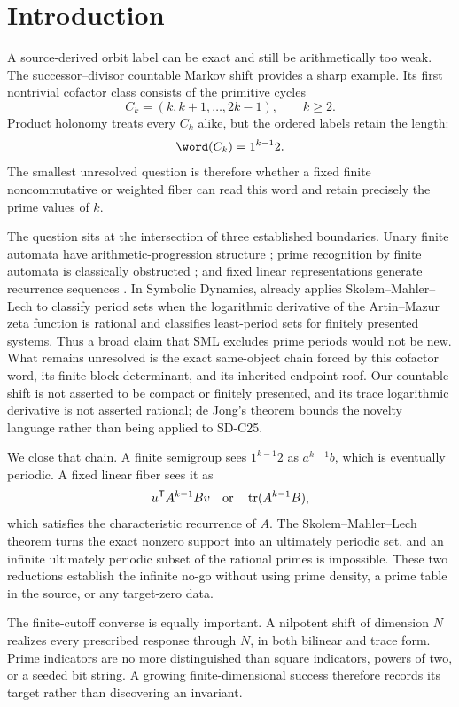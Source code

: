 \section{Introduction}
\label{sec:introduction}

A source-derived orbit label can be exact and still be arithmetically too
weak.  The successor--divisor countable Markov shift provides a sharp
example.  Its first nontrivial cofactor class consists of the primitive
cycles
\[
        C_k=(k,k+1,\ldots,2k-1),\qquad k\ge2.
\]
Product holonomy treats every \(C_k\) alike, but the ordered labels retain
the length:
\[
        \word(C_k)=1^{k-1}2.
\]
The smallest unresolved question is therefore whether a fixed finite
noncommutative or weighted fiber can read this word and retain precisely the
prime values of \(k\).

The question sits at the intersection of three established boundaries.
Unary finite automata have arithmetic-progression structure
\citep{Chrobak1986,Chrobak2003Erratum,To2009}; prime recognition by finite
automata is classically obstructed \citep{HartmanisShank1968}; and fixed
linear representations generate recurrence sequences
\citep{Schutzenberger1961}.  In Symbolic Dynamics, \citet{deJong2026}
already applies Skolem--Mahler--Lech to classify period sets when the
logarithmic derivative of the Artin--Mazur zeta function is rational and
classifies least-period sets for finitely presented systems.  Thus a broad
claim that SML excludes prime periods would not be new.  What remains
unresolved is the exact same-object chain forced by this cofactor word, its
finite block determinant, and its inherited endpoint roof.
Our countable shift is not asserted to be compact or finitely presented,
and its trace logarithmic derivative is not asserted rational; de Jong's
theorem bounds the novelty language rather than being applied to SD-C25.

We close that chain.  A finite semigroup sees \(1^{k-1}2\) as
\(a^{k-1}b\), which is eventually periodic.  A fixed linear fiber sees it as
\[
        u^{\mathsf T}A^{k-1}Bv
        \quad\hbox{or}\quad
        \operatorname{tr}(A^{k-1}B),
\]
which satisfies the characteristic recurrence of \(A\).  The
Skolem--Mahler--Lech theorem turns the exact nonzero support into an
ultimately periodic set, and an infinite ultimately periodic subset of the
rational primes is impossible.  These two reductions establish the
infinite no-go without using prime density, a prime table in the source, or
any target-zero data.

The finite-cutoff converse is equally important.  A nilpotent shift of
dimension \(N\) realizes every prescribed response through \(N\), in both
bilinear and trace form.  Prime indicators are no more distinguished than
square indicators, powers of two, or a seeded bit string.  A growing
finite-dimensional success therefore records its target rather than
discovering an invariant.

